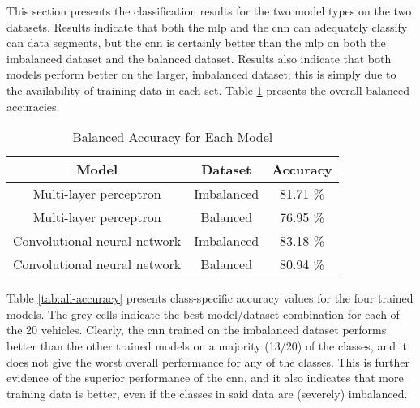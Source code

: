 \documentclass[../main.tex]{subfiles}
\begin{document}

This section presents the classification results for the two model types on the two datasets. Results indicate that both the \acl{mlp} and the \acl{cnn} can adequately classify \ac{can} data segments, but the \ac{cnn} is certainly better than the \ac{mlp} on both the imbalanced dataset and the balanced dataset. Results also indicate that both models perform better on the larger, imbalanced dataset; this is simply due to the availability of training data in each set. Table \ref{tab:balanced-accuracy} presents the overall balanced accuracies.

\begin{table}
    \caption{Balanced Accuracy for Each Model}
    \centering
    \label{tab:balanced-accuracy}
    \begin{tabular}{|c|c|c|}
    \hline
    \textbf{Model} & \textbf{Dataset} & \textbf{Accuracy} \\
    \hline
    Multi-layer perceptron       & Imbalanced & 81.71 \% \\
    Multi-layer perceptron       & Balanced   & 76.95 \% \\
    Convolutional neural network & Imbalanced & 83.18 \% \\
    Convolutional neural network & Balanced   & 80.94 \% \\
    \hline
    \end{tabular}
\end{table}

Table \ref{tab:all-accuracy} presents class-specific accuracy values for the four trained models. The grey cells indicate the best model/dataset combination for each of the 20 vehicles. Clearly, the \ac{cnn} trained on the imbalanced dataset performs better than the other trained models on a majority (13/20) of the classes, and it does not give the worst overall performance for any of the classes. This is further evidence of the superior performance of the \ac{cnn}, and it also indicates that more training data is better, even if the classes in said data are (severely) imbalanced.
\end{document}
